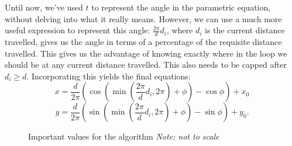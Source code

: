\documentclass[twocolumn,11pt]{article}
\begin{document}
Until now, we've used $t$ to represent the angle in the parametric equation,
without delving into what it really means. However, we can use a much more
useful expression to represent this angle: $\frac{2\pi}{d}d_i$, where $d_i$ is
the current distance travelled, gives us the
angle in terms of a percentage of the requisite distance travelled. This gives
us the advantage of knowing exactly where in the loop we should be at any
current distance travelled. This also needs to be capped after $d_i \geq d$.
Incorporating this yields the final equations:
\[ x = \frac{d}{2\pi}(\cos (\min(\frac{2\pi}{d}d_i,2\pi) + \phi) - \cos \phi) + x_0 \]
\[ y = \frac{d}{2\pi}(\sin (\min(\frac{2\pi}{d}d_i,2\pi) + \phi) - \sin \phi)+ y_0. \]

\begin{figure}
  \centering
  \caption{Important values for the algorithm \emph{Note: not to scale}}
  \label{fig:algvals}
\end{figure}
\end{document}
